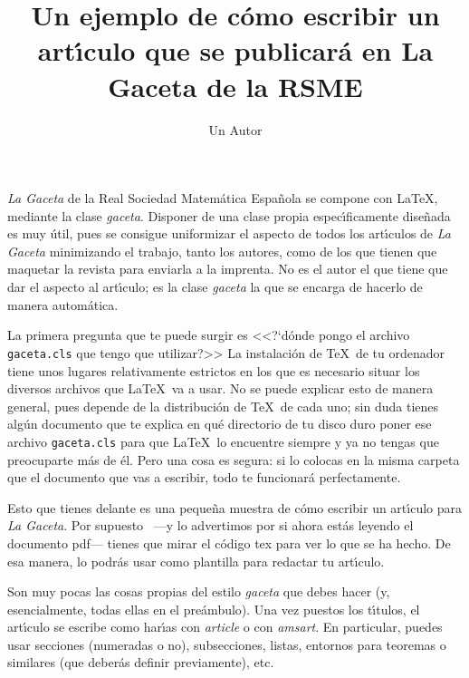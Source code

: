 \documentclass[autocontact]{gaceta}
\title{Un ejemplo de c\'omo escribir un art\'{\i}culo que 
se publicar\'a en La Gaceta de la RSME}
\author{Un Autor} %
\begin{document}

\maketitle



\textit{La Gaceta} de la Real Sociedad Matem\'atica Espa\~nola se compone con \LaTeX, mediante la clase \textit{gaceta}. Disponer de una clase propia espec\'{\i}ficamente dise\~nada es muy \'util, pues se consigue uniformizar el aspecto de todos los art\'{\i}culos de \textit{La Gaceta} minimizando el trabajo, tanto los autores, como de los que tienen que maquetar la revista para enviarla a la imprenta. No es el autor el que tiene que dar el aspecto al art\'{\i}culo; es la clase \textit{gaceta} la que se encarga de hacerlo de manera autom\'atica.

La primera pregunta que te puede surgir es <<?`d\'onde pongo el archivo \texttt{gaceta.cls} que tengo que utilizar?>> La instalaci\'on de \TeX\ de tu ordenador tiene unos lugares relativamente estrictos en los que es necesario situar los diversos archivos que \LaTeX\ va a usar. No se puede explicar esto de manera general, pues depende de la distribuci\'on de \TeX\ de cada uno; sin duda tienes alg\'un documento que te explica en qu\'e directorio de tu disco duro poner ese archivo \texttt{gaceta.cls} para que \LaTeX\ lo encuentre siempre y ya no tengas que preocuparte m\'as de \'el. Pero una cosa es segura: si lo colocas en la misma carpeta que el documento que vas a escribir, todo te funcionar\'a perfectamente.

Esto que tienes delante es una peque\~na muestra de c\'omo escribir un art\'{\i}culo para \textit{La Gaceta}. Por supuesto ~---y lo advertimos por si ahora est\'as leyendo el documento pdf--- tienes que mirar el c\'odigo tex para ver lo que se ha hecho. De esa manera, lo podr\'as usar como plantilla para redactar tu art\'{\i}culo.

Son muy pocas las cosas propias del estilo \textit{gaceta} que debes hacer (y, esencialmente, todas ellas en el pre\'ambulo).
Una vez puestos los t\'{\i}tulos, el art\'{\i}culo se escribe como har\'{\i}as con \textit{article} o con \textit{amsart}. En particular, puedes usar secciones (numeradas o no), subsecciones, listas, entornos para teoremas o similares (que deber\'as definir previamente), etc.
\end{document}
